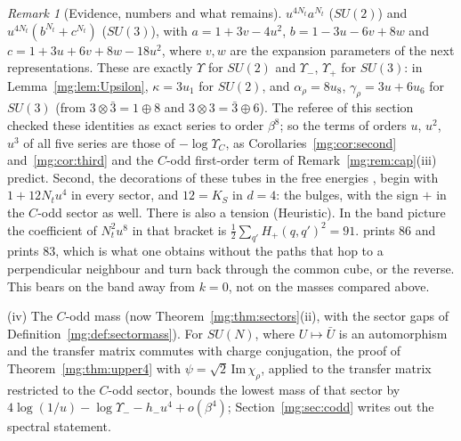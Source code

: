 \documentclass[11pt,a4paper]{article}
\theoremstyle{definition}
\theoremstyle{remark}
\newtheorem{remark}[theorem]{Remark}
\begin{document}
\begin{remark}[Evidence, numbers and what remains]
$u^{4N_t}a^{N_t}$ ($SU(2)$) and $u^{4N_t}(b^{N_t}+c^{N_t})$ ($SU(3)$), with $a=1+3v-4u^2$, $b=1-3u-6v+8w$ and $c=1+3u+6v+8w-18u^2$, where $v,w$ are the expansion
parameters of the next representations. These are exactly $\Upsilon$ for $SU(2)$ and $\Upsilon_-$, $\Upsilon_+$ for $SU(3)$: in Lemma~\ref{mg:lem:Upsilon},
$\kappa=3u_{1}$ for $SU(2)$, and $\alpha_\rho=8u_8$, $\gamma_\rho=3u+6u_6$ for $SU(3)$ (from $3\otimes\bar3=1\oplus8$ and $3\otimes3=\bar3\oplus6$). The referee of this section
checked these identities as exact series to order $\beta^8$; so the terms of orders $u$, $u^2$, $u^3$ of all five series are those of $-\log\Upsilon_C$, as
Corollaries~\ref{mg:cor:second} and~\ref{mg:cor:third} and the $C$-odd first-order term of Remark~\ref{mg:rem:cap}(iii) predict. Second, the decorations of these
tubes in the free energies \cite[eqs.~(2.10)--(2.11)]{LMP07}, \cite[eq.~(23)]{LMP08} begin with $1+12N_tu^4$ in every sector, and $12=K_S$ in $d=4$: the bulges,
with the sign $+$ in the $C$-odd sector as well. There is also a tension (Heuristic). In the band picture the coefficient of $N_t^2u^8$ in that bracket is
$\frac12\sum_{q'}H_+(q,q')^2=91$. \cite[eq.~(2.10)]{LMP07} prints $86$ and \cite[eq.~(23)]{LMP08} prints $83$, which is what one obtains without the paths that hop
to a perpendicular neighbour and turn back through the common cube, or the reverse. This bears on the band away from $k=0$, not on the masses compared above.

(iv) The $C$-odd mass (now Theorem~\ref{mg:thm:sectors}(ii), with the sector gaps of Definition~\ref{mg:def:sectormass}). For $SU(N)$, where $U\mapsto\bar U$ is an automorphism and the transfer matrix commutes with
charge conjugation, the proof of Theorem~\ref{mg:thm:upper4} with $\psi=\sqrt2\,\mathrm{Im}\,\chi_\rho$, applied to the transfer matrix restricted to the $C$-odd
sector, bounds the lowest mass of that sector by $4\log(1/u)-\log\Upsilon_--h_-u^4+o(\beta^4)$; Section~\ref{mg:sec:codd} writes out the spectral statement.


\end{remark}
\end{document}
